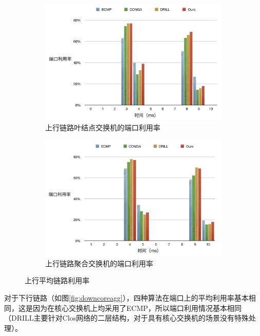 \begin{figure}[htb!]
\centering
\begin{subfigure}{0.47\textwidth}
     \includegraphics[width=\textwidth]{figure/upleaf.png}
     \caption{上行链路叶结点交换机的端口利用率}
\end{subfigure}\hspace{2em}
\begin{subfigure}{0.47\textwidth}
    \includegraphics[width=\textwidth]{figure/upagg.png}
    \caption{上行链路聚合交换机的端口利用率}

\end{subfigure}%
\caption{上行平均链路利用率}
\label{fig:upleafagg}
\end{figure}


对于下行链路（如图\ref{fig:downcoreagg}），四种算法在端口上的平均利用率基本相同，这是因为在核心交换机上均采用了ECMP，所以端口利用情况基本相同（DRILL主要针对Clos网络的二层结构，对于具有核心交换机的场景没有特殊处理）。


